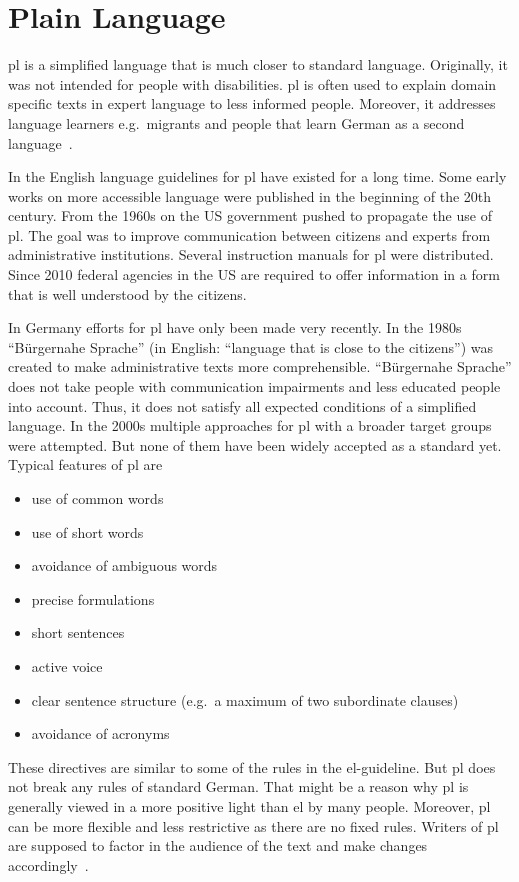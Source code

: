\section{Plain Language}\label{sec:pl}
\gls{pl} is a simplified language that is much closer to standard language.
Originally, it was not intended for people with disabilities.
\gls{pl} is often used to explain domain specific texts in expert language to less informed people.
Moreover, it addresses language learners e.g.\ migrants and people that learn German as a second language~\autocite{easyLanguageBook}.

In the English language guidelines for \gls{pl} have existed for a long time.
Some early works on more accessible language were published in the beginning of the 20th century.
From the 1960s on the US government pushed to propagate the use of \gls{pl}.
The goal was to improve communication between citizens and experts from administrative institutions.
Several instruction manuals for \gls{pl} were distributed.
Since 2010 federal agencies in the US are required to offer information in a form that is well understood by the citizens.

In Germany efforts for \gls{pl} have only been made very recently.
In the 1980s \enquote{Bürgernahe Sprache} (in English: \enquote{language that is close to the citizens}) was created to make administrative texts more comprehensible.
\enquote{Bürgernahe Sprache} does not take people with communication impairments and less educated people into account.
Thus, it does not satisfy all expected conditions of a simplified language.
In the 2000s multiple approaches for \gls{pl} with a broader target groups were attempted.
But none of them have been widely accepted as a standard yet.
Typical features of \gls{pl} are
\begin{itemize}[noitemsep]
    \item use of common words
    \item use of short words
    \item avoidance of ambiguous words
    \item precise formulations
    \item short sentences
    \item active voice
    \item clear sentence structure (e.g.\ a maximum of two subordinate clauses)
    \item avoidance of acronyms
\end{itemize}
These directives are similar to some of the rules in the \gls{el}-guideline.
But \gls{pl} does not break any rules of standard German.
That might be a reason why \gls{pl} is generally viewed in a more positive light than \gls{el} by many people. %
Moreover, \gls{pl} can be more flexible and less restrictive as there are no fixed rules.
Writers of \gls{pl} are supposed to factor in the audience of the text and make changes accordingly~\autocite{easyLanguageBook}.

